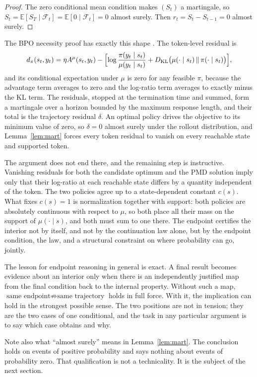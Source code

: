 \documentclass[11pt]{article}
\theoremstyle{remark}
\begin{document}
\begin{proof}
The zero conditional mean condition makes $(S_t)$ a martingale, so $S_t=\mathbb E[S_T\mid\mathcal F_t]=\mathbb E[0\mid\mathcal F_t]=0$ almost surely. Then $r_t=S_t-S_{t-1}=0$ almost surely.
\end{proof}

The BPO necessity proof has exactly this shape \cite{bpo}. The token-level residual is
\[
d_\pi(s_t,y_t)=\eta A^\mu(s_t,y_t)-\Bigl[\log\frac{\pi(y_t\mid s_t)}{\mu(y_t\mid s_t)}+D_{\mathrm{KL}}\bigl(\mu(\cdot\mid s_t)\,\|\,\pi(\cdot\mid s_t)\bigr)\Bigr],
\]
and its conditional expectation under $\mu$ is zero for any feasible $\pi$, because the advantage term averages to zero and the log-ratio term averages to exactly minus the KL term. The residuals, stopped at the termination time and summed, form a martingale over a horizon bounded by the maximum response length, and their total is the trajectory residual $\delta$. An optimal policy drives the objective to its minimum value of zero, so $\delta=0$ almost surely under the rollout distribution, and Lemma~\ref{lem:mart} forces every token residual to vanish on every reachable state and supported token.

The argument does not end there, and the remaining step is instructive. Vanishing residuals for both the candidate optimum and the PMD solution imply only that their log-ratio at each reachable state differs by a quantity independent of the token. The two policies agree up to a state-dependent constant $c(s)$. What fixes $c(s)=1$ is normalization together with support: both policies are absolutely continuous with respect to $\mu$, so both place all their mass on the support of $\mu(\cdot\mid s)$, and both must sum to one there. The endpoint certifies the interior not by itself, and not by the continuation law alone, but by the endpoint condition, the law, and a structural constraint on where probability can go, jointly.

The lesson for endpoint reasoning in general is exact. A final result becomes evidence about an interior only when there is an independently justified map from the final condition back to the internal property. Without such a map, $\text{same endpoint}\not\Rightarrow\text{same trajectory}$ holds in full force. With it, the implication can hold in the strongest possible sense. The two positions are not in tension; they are the two cases of one conditional, and the task in any particular argument is to say which case obtains and why.

Note also what ``almost surely'' means in Lemma~\ref{lem:mart}. The conclusion holds on events of positive probability and says nothing about events of probability zero. That qualification is not a technicality. It is the subject of the next section.
\end{document}
